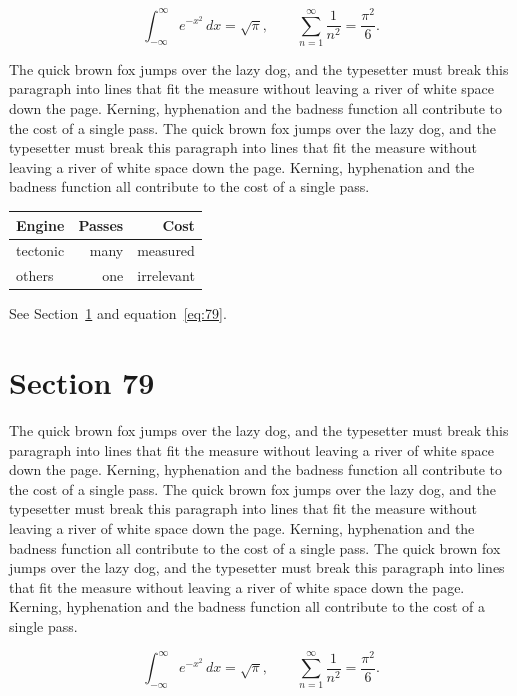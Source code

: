 \documentclass{article}
\begin{document}
\begin{equation}\label{eq:78}
\int_{-\infty}^{\infty} e^{-x^{2}}\,dx = \sqrt{\pi}, \qquad
\sum_{n=1}^{\infty} \frac{1}{n^{2}} = \frac{\pi^{2}}{6}.
\end{equation}

The quick brown fox jumps over the lazy dog, and the typesetter must break this paragraph into lines that fit the measure without leaving a river of white space down the page. Kerning, hyphenation and the badness function all contribute to the cost of a single pass. The quick brown fox jumps over the lazy dog, and the typesetter must break this paragraph into lines that fit the measure without leaving a river of white space down the page. Kerning, hyphenation and the badness function all contribute to the cost of a single pass. 

\begin{center}
\begin{tabular}{lrr}
\toprule
Engine & Passes & Cost \\
\midrule
tectonic & many & measured \\
others & one & irrelevant \\
\bottomrule
\end{tabular}
\end{center}

See Section~\ref{sec:79} and equation~\eqref{eq:79}.
\section{Section 79}
\label{sec:79}
The quick brown fox jumps over the lazy dog, and the typesetter must break this paragraph into lines that fit the measure without leaving a river of white space down the page. Kerning, hyphenation and the badness function all contribute to the cost of a single pass. The quick brown fox jumps over the lazy dog, and the typesetter must break this paragraph into lines that fit the measure without leaving a river of white space down the page. Kerning, hyphenation and the badness function all contribute to the cost of a single pass. The quick brown fox jumps over the lazy dog, and the typesetter must break this paragraph into lines that fit the measure without leaving a river of white space down the page. Kerning, hyphenation and the badness function all contribute to the cost of a single pass. 

\begin{equation}\label{eq:79}
\int_{-\infty}^{\infty} e^{-x^{2}}\,dx = \sqrt{\pi}, \qquad
\sum_{n=1}^{\infty} \frac{1}{n^{2}} = \frac{\pi^{2}}{6}.
\end{equation}
\end{document}
